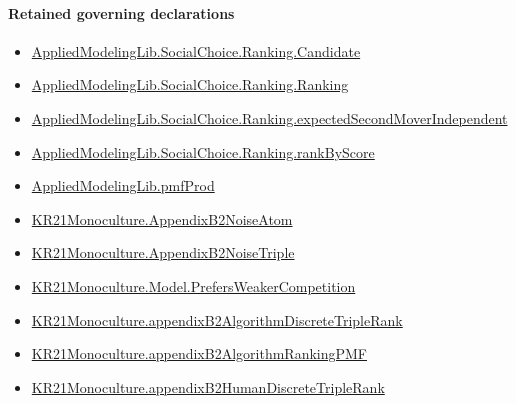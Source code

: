 \documentclass[10pt]{article}
\begin{document}
\paragraph{Retained governing declarations}
\begin{itemize}\raggedright
\item \hyperlink{library-prerequisite-8c0e6c25845ae78a}{Applied\allowbreak{}Modeling\allowbreak{}Lib.\allowbreak{}Social\allowbreak{}Choice.\allowbreak{}Ranking.\allowbreak{}Candidate}
\item \hyperlink{library-prerequisite-5cde54446d1ae021}{Applied\allowbreak{}Modeling\allowbreak{}Lib.\allowbreak{}Social\allowbreak{}Choice.\allowbreak{}Ranking.\allowbreak{}Ranking}
\item \hyperlink{governing-declaration-4f697449f42135d1}{Applied\allowbreak{}Modeling\allowbreak{}Lib.\allowbreak{}Social\allowbreak{}Choice.\allowbreak{}Ranking.\allowbreak{}expected\allowbreak{}Second\allowbreak{}Mover\allowbreak{}Independent}
\item \hyperlink{governing-declaration-c2e98278351275b0}{Applied\allowbreak{}Modeling\allowbreak{}Lib.\allowbreak{}Social\allowbreak{}Choice.\allowbreak{}Ranking.\allowbreak{}rank\allowbreak{}By\allowbreak{}Score}
\item \hyperlink{governing-declaration-de8e2a8bfe221a38}{Applied\allowbreak{}Modeling\allowbreak{}Lib.\allowbreak{}pmf\allowbreak{}Prod}
\item \hyperlink{governing-declaration-a251de733d2f986a}{KR21\allowbreak{}Monoculture.\allowbreak{}Appendix\allowbreak{}B2\allowbreak{}Noise\allowbreak{}Atom}
\item \hyperlink{governing-declaration-5e2e57dad411ac3e}{KR21\allowbreak{}Monoculture.\allowbreak{}Appendix\allowbreak{}B2\allowbreak{}Noise\allowbreak{}Triple}
\item \hyperlink{governing-declaration-911cc6b2748968ba}{KR21\allowbreak{}Monoculture.\allowbreak{}Model.\allowbreak{}Prefers\allowbreak{}Weaker\allowbreak{}Competition}
\item \hyperlink{governing-declaration-e7b5459d813d11dd}{KR21\allowbreak{}Monoculture.\allowbreak{}appendix\allowbreak{}B2\allowbreak{}Algorithm\allowbreak{}Discrete\allowbreak{}Triple\allowbreak{}Rank}
\item \hyperlink{governing-declaration-7611cbfbcc98aa61}{KR21\allowbreak{}Monoculture.\allowbreak{}appendix\allowbreak{}B2\allowbreak{}Algorithm\allowbreak{}Ranking\allowbreak{}PMF}
\item \hyperlink{governing-declaration-1afec50188dfdc44}{KR21\allowbreak{}Monoculture.\allowbreak{}appendix\allowbreak{}B2\allowbreak{}Human\allowbreak{}Discrete\allowbreak{}Triple\allowbreak{}Rank}

\end{itemize}
\end{document}
